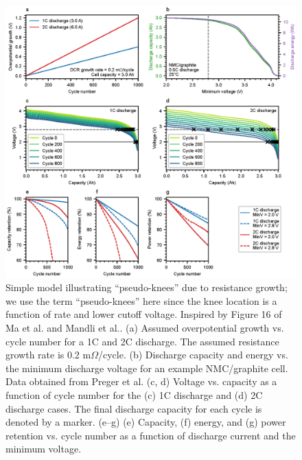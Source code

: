 \documentclass[journal=jpcl, manuscript=article, layout=onecolumn]{achemso}
\begin{document}
\begin{figure}[ht]
\centering
\includegraphics[scale = 1]{figures/dcr_growth_knee_2.eps}
\caption{Simple model illustrating ``pseudo-knees'' due to resistance growth; we use the term ``pseudo-knees'' here since the knee location is a function of rate and lower cutoff voltage. Inspired by Figure 16 of Ma et al.\cite{ma_editors_2019} and Mandli et al.\cite{mandli_analysis_2019}. (a) Assumed overpotential growth vs. cycle number for a 1C and 2C discharge. The assumed resistance growth rate is 0.2 m$\Omega$/cycle. (b) Discharge capacity and energy vs. the minimum discharge voltage for an example NMC/graphite cell. Data obtained from Preger et al.\cite{preger_degradation_2020} (c, d) Voltage vs. capacity as a function of cycle number for the (c) 1C discharge and (d) 2C discharge cases. The final discharge capacity for each cycle is denoted by a marker. (e--g) (e) Capacity, (f) energy, and (g) power retention vs. cycle number as a function of discharge current and the minimum voltage.
}
\label{fig:dcr_knee}
\end{figure}
\end{document}
